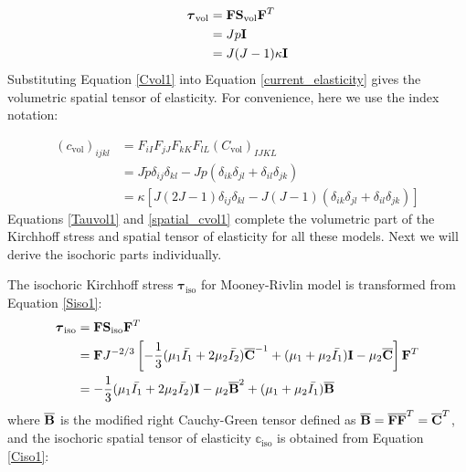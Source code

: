 \begin{appendices}
\begin{subequations}
\label{Tauvol1}
\begin{align}
\boldsymbol{\tau}_\mathrm{vol} &= \bold{F}\bold{S}_\mathrm{vol}{\bold{F}}^T \\
				    &= Jp\bold{I} \label{Tauvol11}\\
		      		    &= J(J-1)\kappa \bold{I} \label{Tauvol12}
\end{align}
\end{subequations}
Substituting Equation \ref{Cvol1} into Equation \ref{current_elasticity} gives the volumetric spatial tensor of elasticity. For convenience, here we use the index notation:

\begin{subequations} \label{spatial_cvol1}
\begin{align}
(c_\mathrm{vol})_{ijkl} &= F_{iI}F_{jJ}F_{kK}F_{lL}(C_\mathrm{vol})_{IJKL} \\
&= J\tilde{p}\delta_{ij}\delta_{kl} - Jp(\delta_{ik}\delta_{jl} + \delta_{il}\delta_{jk}) \label{spatial_cvol11} \\
&= \kappa[J(2J-1)\delta_{ij}\delta_{kl} - J(J-1)(\delta_{ik}\delta_{jl} + \delta_{il}\delta_{jk})] \label{spatial_cvol12}
\end{align}
\end{subequations} 
Equations \ref{Tauvol1} and \ref{spatial_cvol1} complete the volumetric part of the Kirchhoff stress and spatial tensor of elasticity for all these models. Next we will derive the isochoric parts individually.

The isochoric Kirchhoff stress $\boldsymbol{\tau}_\mathrm{iso}$ for Mooney-Rivlin model is transformed from Equation \ref{Siso1}:
\begin{equation} \label{Tauiso1}
\begin{split}
\boldsymbol{\tau}_\mathrm{iso} &= \bold{F}\bold{S}_\mathrm{iso}{\bold{F}}^T \\
	   			    &= \bold{F}  J^{-2/3} \left[    - \frac{1}{3}(\mu_1\bar{I_1} + 2\mu_2\bar{I_2}) \overline{\bold{C}}^{-1}  + (\mu_1 + \mu_2\bar{I_1})\bold{I} - \mu_2\overline{\bold{C}} \right]   \bold{F}^T 
\\
				    &= - \frac{1}{3}(\mu_1\bar{I_1} + 2\mu_2\bar{I_2})\bold{I} - \mu_2{\overline{\bold{B}}}^2 + (\mu_1 + \mu_2\bar{I_1}){\overline{\bold{B}}}
\end{split}
\end{equation}
where $\overline{\bold{B}}$ is the modified right Cauchy-Green tensor defined as $\overline{\bold{B}} = \overline{\bold{F}}\overline{\bold{F}}^T = \overline{\bold{C}}^T$, and the isochoric spatial tensor of elasticity $\mathbb{c}_\mathrm{iso}$ is obtained from Equation \ref{Ciso1}:


\end{appendices}
